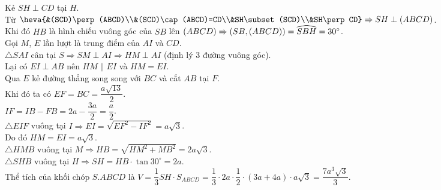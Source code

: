 \begin{ex}
{\begin{center}
		\end{center}
		Kẻ $SH\perp CD$ tại $H$.\\
		Từ $\heva{&(SCD)\perp (ABCD)\\&(SCD)\cap (ABCD)=CD\\&SH\subset (SCD)\\&SH\perp CD}\Rightarrow SH\perp (ABCD)$.\\
		Khi đó $HB$ là hình chiếu vuông góc của $SB$ lên $(ABCD)\\ \Rightarrow (SB,(ABCD))=\widehat{SBH}=30^\circ$.\\
		Gọi $M$, $E$ lần lượt là trung điểm của $AI$ và $CD$.\\
		$\triangle SAI$ cân tại $S\Rightarrow SM\perp AI\Rightarrow HM\perp AI$ (định lý 3 đường vuông góc).\\
		Lại có $EI\perp AB$ nên $HM\parallel EI$ và $HM=EI$. \\
		Qua $E$ kẻ đường thẳng song song với $BC$ và cắt $AB$ tại $F$.\\
		Khi đó ta có $EF=BC=\dfrac{a\sqrt{13}}{2}$.\\
		$IF=IB-FB=2a-\dfrac{3a}{2}=\dfrac{a}{2}$.\\
		$\triangle EIF$ vuông tại $I\Rightarrow EI=\sqrt{EF^2-IF^2}=a\sqrt{3}$.\\
		Do đó $HM=EI=a\sqrt{3}$.\\
		$\triangle HMB$ vuông tại $M\Rightarrow HB=\sqrt{HM^2+MB^2}=2a\sqrt{3}$.\\
		$\triangle SHB$ vuông tại $H\Rightarrow SH=HB\cdot\tan 30^\circ =2a$.\\
		Thể tích của khối chóp $S.ABCD$ là $V=\dfrac{1}{3}SH\cdot S_{ABCD}=\dfrac{1}{3}\cdot 2a\cdot \dfrac{1}{2}\cdot (3a+4a)\cdot a\sqrt{3}=\dfrac{7a^3\sqrt{3}}{3}$.
	}
\end{ex}

